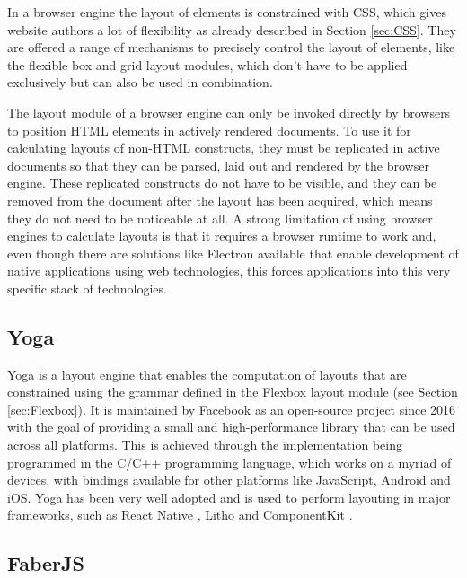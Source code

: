 In a browser engine the layout of elements is constrained with CSS, which gives website authors a lot of flexibility as already described in Section \ref{sec:CSS}. 
They are offered a range of mechanisms to precisely control the layout of elements, like the flexible box and grid layout modules, which don't have to be applied exclusively but can also be used in combination. 

The layout module of a browser engine can only be invoked directly by browsers to position HTML elements in actively rendered documents. 
To use it for calculating layouts of non-HTML constructs, they must be replicated in active documents so that they can be parsed, laid out and rendered by the browser engine. 
These replicated constructs do not have to be visible, and they can be removed from the document after the layout has been acquired, which means they do not need to be noticeable at all. 
A strong limitation of using browser engines to calculate layouts is that it requires a browser runtime to work and, even though there are solutions like Electron available that enable development of native applications using web technologies, this forces applications into this very specific stack of technologies. 

\subsection{Yoga}
\label{sec:Yoga}

Yoga \parencite{Yoga} is a layout engine that enables the computation of layouts that are constrained using the grammar defined in the Flexbox layout module (see Section \ref{sec:Flexbox}). 
It is maintained by Facebook as an open-source project since 2016 \parencite{YogaRelease} with the goal of providing a small and high-performance library that can be used across all platforms. 
This is achieved through the implementation being programmed in the C/C++ programming language, which works on a myriad of devices, with bindings available for other platforms like JavaScript, Android and iOS.
Yoga has been very well adopted and is used to perform layouting in major frameworks, such as React Native \parencite{ReactNative}, Litho \parencite{Litho} and ComponentKit \parencite{ComponentKit}.

\subsection{FaberJS}
\label{sec:FaberJS}

